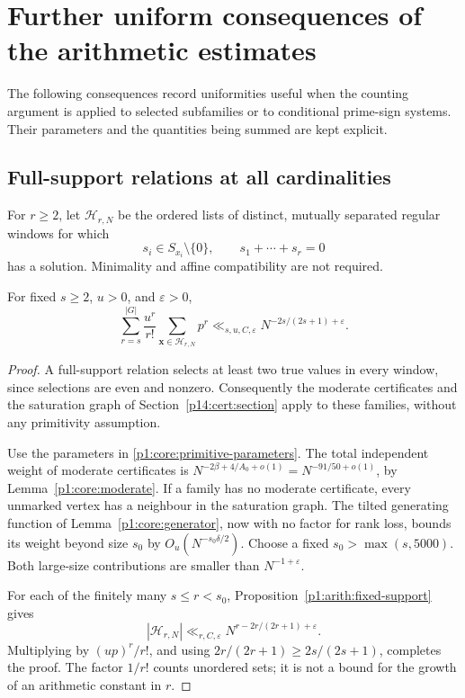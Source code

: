 \section{Further uniform consequences of the arithmetic estimates}
\label{p1:uniform:appendix}

The following consequences record uniformities useful when the
counting argument is applied to selected subfamilies or to
conditional prime-sign systems. Their parameters and the
quantities being summed are kept explicit.

\subsection{Full-support relations at all cardinalities}

For \(r\ge2\), let \(\mathcal H_{r,N}\) be the ordered
lists of distinct, mutually separated regular windows for
which
\[
 s_i\in S_{x_i}\setminus\{0\},\qquad
                     s_1+\cdots+s_r=0
\]
has a solution. Minimality and affine compatibility are
not required.

\begin{proposition}
\label{p1:uniform:full-support}
For fixed \(s\ge2\), \(u>0\), and \(\varepsilon>0\),
\[
 \sum_{r=s}^{|G|}\frac{u^r}{r!}
     \sum_{\boldsymbol x\in\mathcal H_{r,N}}p^r
       \ll_{s,u,C,\varepsilon}N^{-2s/(2s+1)+\varepsilon}.
\]
\end{proposition}

\begin{proof}
A full-support relation selects at least two true
values in every window, since selections are even
and nonzero. Consequently the moderate certificates
and the saturation graph of
Section~\ref{p14:cert:section} apply to these families,
without any primitivity assumption.

Use the parameters in
\eqref{p1:core:primitive-parameters}.
The total independent weight of moderate
certificates is \(N^{-2\beta+4/A_0+o(1)}
=N^{-91/50+o(1)}\), by
Lemma~\ref{p1:core:moderate}.
If a family has no moderate certificate, every
unmarked vertex has a neighbour in the saturation
graph. The tilted generating function of
Lemma~\ref{p1:core:generator}, now with no factor
for rank loss, bounds its weight beyond size \(s_0\)
by \(O_u(N^{-s_0\delta/2})\).
Choose a fixed \(s_0>\max(s,5000)\).
Both large-size contributions are smaller than
\(N^{-1+\varepsilon}\).

For each of the finitely many \(s\le r<s_0\),
Proposition~\ref{p1:arith:fixed-support} gives
\[
 |\mathcal H_{r,N}|
       \ll_{r,C,\varepsilon}
             N^{r-2r/(2r+1)+\varepsilon}.
 \]
Multiplying by \((up)^r/r!\), and using
\(2r/(2r+1)\ge2s/(2s+1)\), completes the proof.
The factor \(1/r!\) counts unordered sets; it is
not a bound for the growth of an arithmetic
constant in \(r\).
\end{proof}

